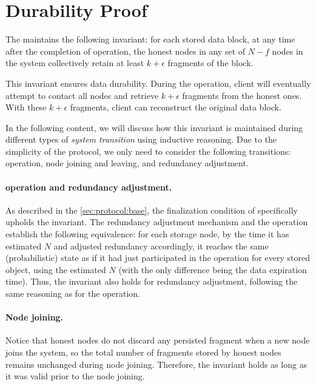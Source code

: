 \section{Durability Proof}
\label{sec:proof}

The \sys maintains the following invariant:
for each stored data block, at any time after the completion of  operation, the honest nodes in any set of $N - f$ nodes in the system collectively retain at least $k + \epsilon$ fragments of the block.

This invariant ensures data durability. During the  operation, client will eventually attempt to contact all nodes and retrieve $k + \epsilon$ fragments from the honest ones.
With these $k + \epsilon$ fragments, client can reconstruct the original data block.

In the following content, we will discuss how this invariant is maintained during different types of \emph{system transition} using inductive reasoning.
Due to the simplicity of the protocol, we only need to consider the following transitions:  operation, node joining and leaving, and redundancy adjustment.

\paragraph{ operation and redundancy adjustment.}
As described in the \autoref{sec:protocol:base}, the finalization condition of  specifically upholds the invariant.
The redundancy adjustment mechanism and the  operation establish the following equivalence: for each storage node, by the time it has estimated $N$ and adjusted redundancy accordingly, it reaches the same (probabilistic) state as if it had just participated in the  operation for every stored object, using the estimated $N$ (with the only difference being the data expiration time).
Thus, the invariant also holds for redundancy adjustment, following the same reasoning as for the  operation.

\paragraph{Node joining.}
Notice that honest nodes do not discard any persisted fragment when a new node joins the system, so the total number of fragments stored by honest nodes remains unchanged during node joining.
Therefore, the invariant holds as long as it was valid prior to the node joining.

